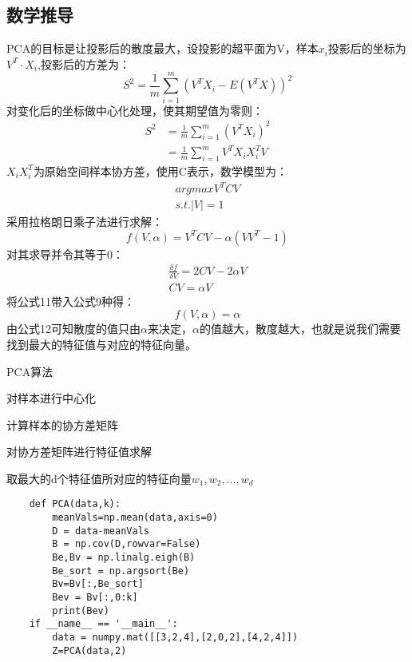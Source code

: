 \documentclass[a4paper]{article}
\begin{document}
	\subsection{数学推导}
			PCA的目标是让投影后的散度最大，设投影的超平面为V，样本$x_{i}$投影后的坐标为$V^{T}\cdot X_{i}$,投影后的方差为：
	\begin{equation}
	S^{2}=\frac{1}{m}\sum_{i=1}^{m}\left ( V^{T}X_{i}-E\left ( V^{T}X \right ) \right )^2
	\end{equation}
	对变化后的坐标做中心化处理，使其期望值为零则：
	\begin{equation}
	\begin{split}
	S^{2}&=\frac{1}{m}\sum_{i=1}^{m}\left ( V^{T}X_{i} \right )^2\\
	&=\frac{1}{m}\sum_{i=1}^{m}V^{T}X_{i}X_{i}^{T}V
	\end{split}
	\end{equation}
	$X_{i}X_{i}^{T}$为原始空间样本协方差，使用C表示，数学模型为：
	\begin{eqnarray*}
	argmaxV^{T}CV\\
	s.t.\left | V \right |=1
	\end{eqnarray*}
	采用拉格朗日乘子法进行求解：
	\begin{equation}
	f(V,\alpha )=V^{T}CV-\alpha \left ( VV^{T}-1 \right )
	\end{equation}
	对其求导并令其等于0：
	\begin{eqnarray}
	\frac{\delta  f}{\delta V}=2CV-2\alpha V\\
	CV=\alpha V
	\end{eqnarray}
	将公式11带入公式9种得：
	\begin{equation}
	f(V,\alpha )=\alpha 
	\end{equation}
	由公式12可知散度的值只由$\alpha$来决定，$\alpha$的值越大，散度越大，也就是说我们需要找到最大的特征值与对应的特征向量。
	
	\begin{algorithm}
		\caption{PCA算法}
		\LinesNumbered
		对样本进行中心化
		
		计算样本的协方差矩阵
		
		对协方差矩阵进行特征值求解
		
		取最大的d个特征值所对应的特征向量$w_{1},w_{2},\ldots,w_{d}$
	\end{algorithm}

	\begin{lstlisting}
	def PCA(data,k):
		meanVals=np.mean(data,axis=0)
		D = data-meanVals
		B = np.cov(D,rowvar=False)
		Be,Bv = np.linalg.eigh(B)
		Be_sort = np.argsort(Be)
		Bv=Bv[:,Be_sort]
		Bev = Bv[:,0:k]
		print(Bev)
	if __name__ == '__main__':
		data = numpy.mat([[3,2,4],[2,0,2],[4,2,4]])
		Z=PCA(data,2)
	\end{lstlisting}
\end{document}
